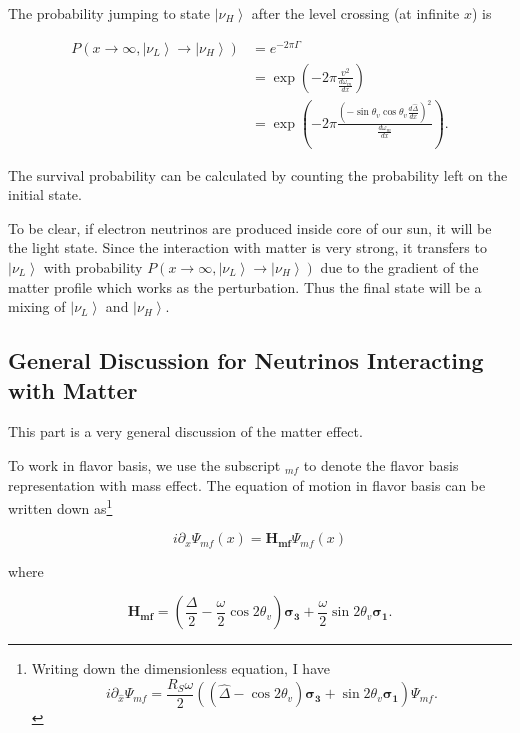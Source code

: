 \documentclass{tufte-handout}
\newcommand{\ket}[1]{\left| #1\right\rangle}
\begin{document}
The probability jumping to state $\ket{\nu_H}$ after the level crossing (at infinite $x$) is

\begin{align*}
P(x\to \infty, \ket{\nu_L}\to\ket{\nu_H}) &= e^{-2\pi\Gamma} \\
& = \exp\left( -2\pi \frac{v^2}{\frac{d\omega_m}{dx}} \right) \\
& = \exp\left( -2\pi \frac{\left( -\sin\theta_v\cos\theta_v \frac{d\hat\Delta}{dx}  \right)^2}{\frac{d\omega_m}{dx}} \right).
\end{align*}

The survival probability can be calculated by counting the probability left on the initial state.

To be clear, if electron neutrinos are produced inside core of our sun, it will be the light state. Since the interaction with matter is very strong, it transfers to $\ket{\nu_L}$ with probability $P(x\to \infty, \ket{\nu_L}\to\ket{\nu_H}) $ due to the gradient of the matter profile which works as the perturbation. Thus the final state will be a mixing of $\ket{\nu_L}$ and $\ket{\nu_H}$.






\subsection{General Discussion for Neutrinos Interacting with Matter}


This part is a very general discussion of the matter effect.\cite{Parke1986}

To work in flavor basis, we use the subscript ${}_{mf}$ to denote the flavor basis representation with mass effect. The equation of motion in flavor basis can be written down as\footnote{Writing down the dimensionless equation, I have 
\begin{equation*}
i \partial_{\hat x} \Psi_{mf} = \frac{R_S \omega}{2} ( (\hat\Delta - \cos 2\theta_v ) \boldsymbol{\sigma_3} + \sin 2\theta_v \boldsymbol{\sigma_1} )  \Psi_{mf} .
\end{equation*}
}

\begin{equation*}
i\partial_x \Psi_{mf}(x) = \mathbf{H_{mf}} \Psi_{mf}(x)
\end{equation*}

where 

\begin{equation*}
\mathbf{H_{mf}} =  \left(  \frac{\Delta}{2} -  \frac{\omega}{2} \cos 2\theta_v  \right) \boldsymbol{\sigma_3} + \frac{\omega}{2} \sin 2\theta_v \boldsymbol{\sigma_1}.
\end{equation*}
\end{document}
